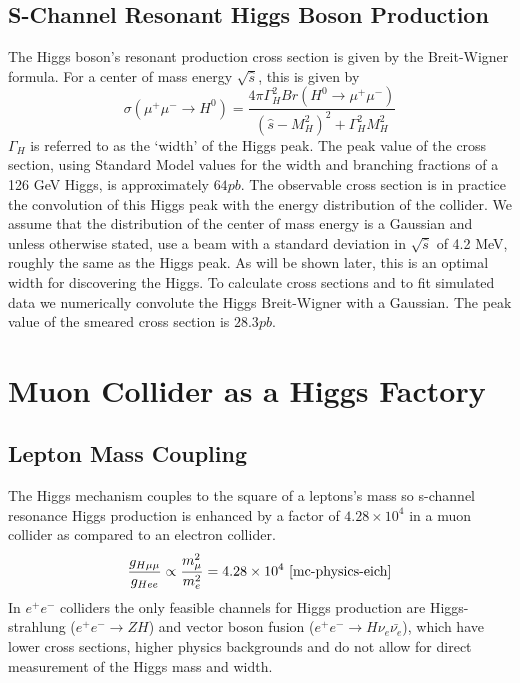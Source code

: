 \documentclass[a4paper]{article}
\begin{document}
\subsection{S-Channel Resonant Higgs Boson Production}
The Higgs boson's resonant production cross section is given by the Breit-Wigner formula. For a center of mass energy $\sqrt{\hat{s}}$, this is given by~\cite{han-higgs-measurement}
\begin{equation}
	\sigma(\mu^+\mu^- \rightarrow H^0) = \frac{4\pi \Gamma_H^2 Br(H^0\rightarrow \mu^+\mu^-)}{{(\hat{s} - M_H^2)}^2 + \Gamma_H^2 M_H^2}\label{eq:higgs-bw}
\end{equation}
$\Gamma_H$ is referred to as the `width' of the Higgs peak. The peak value of the cross section, using Standard Model values for the width and branching fractions of a 126 GeV Higgs, is approximately $64 pb$. The observable cross section is in practice the convolution of this Higgs peak with the energy distribution of the collider. We assume that the distribution of the center of mass energy is a Gaussian and unless otherwise stated, use a beam with a standard deviation in $\sqrt{\hat{s}}$ of 4.2 MeV, roughly the same as the Higgs peak. As will be shown later, this is an optimal width for discovering the Higgs. To calculate cross sections and to fit simulated data we numerically convolute the Higgs Breit-Wigner with a Gaussian. The peak value of the smeared cross section is $28.3 pb$.

\section{Muon Collider as a Higgs Factory}

	\subsection{Lepton Mass Coupling}
	The Higgs mechanism couples to the square of a leptons's mass so s-channel resonance Higgs production is enhanced by a factor of $4.28\times 10^4$ in a muon collider as compared to an electron collider\cite{mc-physics-eich}.
\begin{equation}
	\frac{g_{H\mu\mu}}{g_{Hee}} \propto \frac{m_{\mu}^2}{m_e^2} = 4.28\times 10^4~\cite{mc-physics-eich}
\label{lepton-coupling}
\end{equation}
In $e^+e^-$ colliders the only feasible channels for Higgs production are Higgs-strahlung ($e^+e^-\rightarrow ZH$) and vector boson fusion ($e^+e^-\rightarrow H\nu_e\bar{\nu_e}$), which have lower cross sections, higher physics backgrounds and do not allow for direct measurement of the Higgs mass and width.
\end{document}
